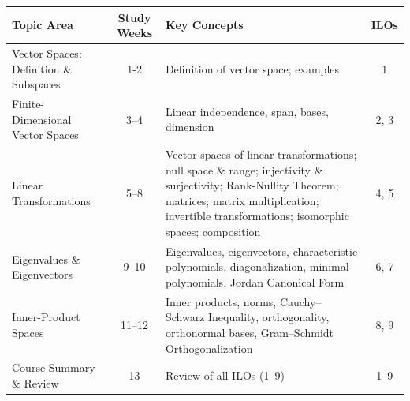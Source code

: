 \documentclass[12pt]{article}
\title{\vspace{-0.5cm}{\Large\bfseries \CourseCode\ \CourseName{} -- \DocType}}
\author{Quantitative Research Society @ NTU}
\date{\AcademicYear}
\newcommand{\CourseCode}{MH1201}
\newcommand{\CourseName}{Linear Algebra II}
\begin{document}
\maketitle
\thispagestyle{plainfirst}

\begin{abstract}
\noindent
Comprehensive revision notes for \CourseCode\ \CourseName, integrating theoretical concepts, key formulas, worked examples, and exam-focused applications. These notes cover abstract vector spaces, linear transformations, matrix representations, eigenvalues, Jordan Canonical Form, and inner-product spaces.
\end{abstract}

\begin{center}
\small
\begin{tabular}{|p{4.5cm}|c|p{5.5cm}|c|}
\hline
\textbf{Topic Area} & \textbf{Study Weeks} & \textbf{Key Concepts} & \textbf{ILOs} \\
\hline
Vector Spaces: Definition \& Subspaces & 1-2 & Definition of vector space; examples & 1 \\
\hline
Finite-Dimensional Vector Spaces & 3--4 & Linear independence, span, bases, dimension & 2, 3 \\
\hline
Linear Transformations & 5--8 & Vector spaces of linear transformations; null space \& range; injectivity \& surjectivity; Rank-Nullity Theorem; matrices; matrix multiplication; invertible transformations; isomorphic spaces; composition & 4, 5 \\
\hline
Eigenvalues \& Eigenvectors & 9--10 & Eigenvalues, eigenvectors, characteristic polynomials, diagonalization, minimal polynomials, Jordan Canonical Form & 6, 7 \\
\hline
Inner-Product Spaces & 11--12 & Inner products, norms, Cauchy--Schwarz Inequality, orthogonality, orthonormal bases, Gram--Schmidt Orthogonalization & 8, 9 \\
\hline
Course Summary \& Review & 13 & Review of all ILOs (1--9) & 1--9 \\
\hline
\end{tabular}
\end{center}

\vspace{0.5cm}
\newpage
\tableofcontents
\newpage

\fontsize{10.5pt}{11.5pt}\selectfont
\pagestyle{main}

\newpage
\end{document}
